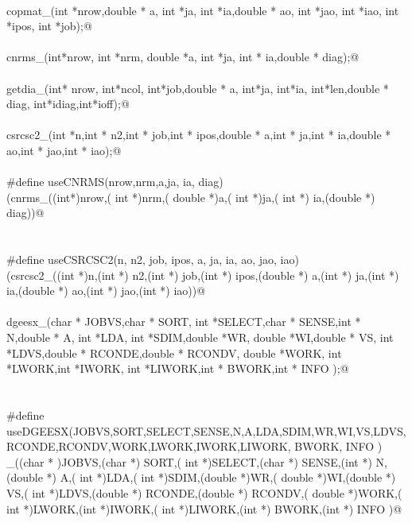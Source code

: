 \documentclass[12pt]{article}
\begin{document}
\begin{flushleft}
\begin{minipage}{\linewidth}
\begin{list}{}{}
\mbox{}\verb@@\\
\mbox{}\verb@int copmat_(int *nrow,double * a, int *ja, int *ia,double * ao, int *jao, int *iao, int *ipos, int *job);@\\
\mbox{}\verb@@\\
\mbox{}\verb@int cnrms_(int*nrow, int *nrm, double *a, int *ja, int * ia,double * diag);@\\
\mbox{}\verb@@\\
\mbox{}\verb@int getdia_(int* nrow, int*ncol, int*job,double * a, int*ja, int*ia, int*len,double * diag, int*idiag,int*ioff);@\\
\mbox{}\verb@@\\
\mbox{}\verb@int csrcsc2_(int *n,int * n2,int * job,int * ipos,double *  a,int *  ja,int * ia,double * ao,int *  jao,int *  iao);@\\
\mbox{}\verb@@\\
\mbox{}\verb@#define  useCNRMS(nrow,nrm,a,ja, ia, diag)\@\\
\mbox{}\verb@(cnrms_((int*)nrow,( int *)nrm,( double *)a,( int *)ja,( int *) ia,(double *) diag))@\\
\mbox{}\verb@@\\
\mbox{}\verb@@\\
\mbox{}\verb@#define  useCSRCSC2(n, n2, job, ipos,  a,  ja, ia, ao,  jao,  iao)\@\\
\mbox{}\verb@(csrcsc2_((int *)n,(int *) n2,(int *) job,(int *) ipos,(double *)  a,(int *)  ja,(int *) ia,(double *) ao,(int *)  jao,(int *)  iao))@\\
\mbox{}\verb@@\\
\mbox{}\verb@void dgeesx_(char * JOBVS,char * SORT, int *SELECT,char * SENSE,int * N,double * A, int *LDA, int *SDIM,double *WR, double *WI,double * VS, int *LDVS,double * RCONDE,double * RCONDV, double *WORK, int *LWORK,int *IWORK, int *LIWORK,int * BWORK,int * INFO );@\\
\mbox{}\verb@@\\
\mbox{}\verb@@\\
\mbox{}\verb@#define useDGEESX(JOBVS,SORT,SELECT,SENSE,N,A,LDA,SDIM,WR,WI,VS,LDVS,RCONDE,RCONDV,WORK,LWORK,IWORK,LIWORK, BWORK, INFO )\@\\
\mbox{}\verb@dgeesx_((char * )JOBVS,(char *) SORT,( int *)SELECT,(char *) SENSE,(int *) N,(double *) A,( int *)LDA,( int *)SDIM,(double *)WR,( double *)WI,(double *) VS,( int *)LDVS,(double *) RCONDE,(double *) RCONDV,( double *)WORK,( int *)LWORK,(int *)IWORK,( int *)LIWORK,(int *) BWORK,(int *) INFO )@\\

\end{list}
\end{minipage}
\end{flushleft}
\end{document}
